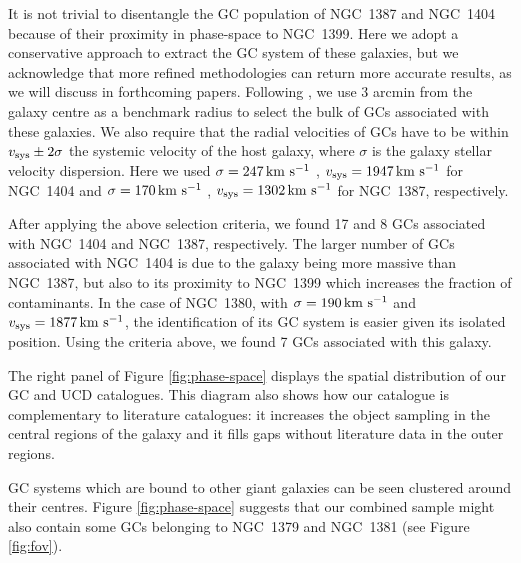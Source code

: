 \documentclass[usenatbib]{mnras}
\newcommand{\kms}{\mbox{\,km~s$^{-1}$}}
\begin{document}
It is not trivial to disentangle the GC population of NGC~1387 and NGC~1404
because of their proximity in phase-space to NGC~1399.
Here we adopt a conservative approach to extract the GC system of these
galaxies, but we acknowledge that more refined methodologies can return more
accurate results, as we will discuss in forthcoming papers.
Following \citet{Schuberth}, we use 3 arcmin from the galaxy
centre as a benchmark radius to select the bulk of GCs associated with these
galaxies. We also require that the radial velocities of GCs have to be within
$v_{\rm sys} \pm 2\sigma$  the systemic velocity of the host galaxy, where
$\sigma$ is the galaxy stellar velocity dispersion. Here we used $\sigma = 247
\kms$  \citep{Vanderbeke11}, $v_{\rm sys} = 1947 \kms$ for NGC~1404 and $\sigma
= 170 \kms$ \citep{Wegner03}, $v_{\rm sys} = 1302\kms $ for NGC~1387,
respectively.

After applying the above selection criteria, we found 17 and 8
GCs associated with NGC~1404 and NGC~1387, respectively.
The larger number of
GCs associated with NGC~1404 is due to the galaxy being more massive than
NGC~1387, but also to its proximity to NGC~1399 which increases the fraction of
contaminants.
In the case of NGC~1380, with $\sigma = 190 \kms$  \citep{Vanderbeke11} and
$v_{\rm sys} = 1877 \kms$, the identification of its GC system is easier given
its isolated position. Using the criteria above, we found 7 GCs associated with
this galaxy.

The right panel of Figure \ref{fig:phase-space} displays the spatial
distribution of our GC and UCD catalogues. This diagram also shows how our
catalogue is complementary to literature catalogues: it increases the object
sampling in the central regions of the galaxy and it fills gaps without literature data in
the outer regions.

GC systems which are bound to other giant galaxies can be seen clustered around
their centres. Figure \ref{fig:phase-space} suggests that our combined sample
might also contain some GCs belonging to NGC~1379 and NGC~1381 (see Figure
\ref{fig:fov}).
\end{document}
